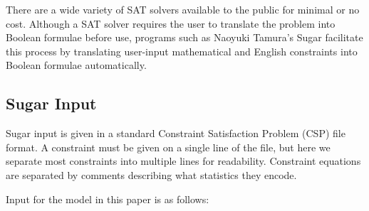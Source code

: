 \documentclass[runningheads]{llncs}
\begin{document}
There are a wide variety of SAT solvers available to the public for
minimal or no cost. Although a SAT solver requires the user to
translate the problem into Boolean formulae before use, programs such
as Naoyuki Tamura's Sugar facilitate this process by translating
user-input mathematical and English constraints into Boolean formulae
automatically.

\subsection{Sugar Input}

Sugar input is given in a standard Constraint Satisfaction Problem
(CSP) file format. A constraint must be given on a single line of the
file, but here we separate most constraints into multiple lines for
readability. Constraint equations are separated by comments describing
what statistics they encode.

Input for the model in this paper is as follows:


\fi
\end{document}
